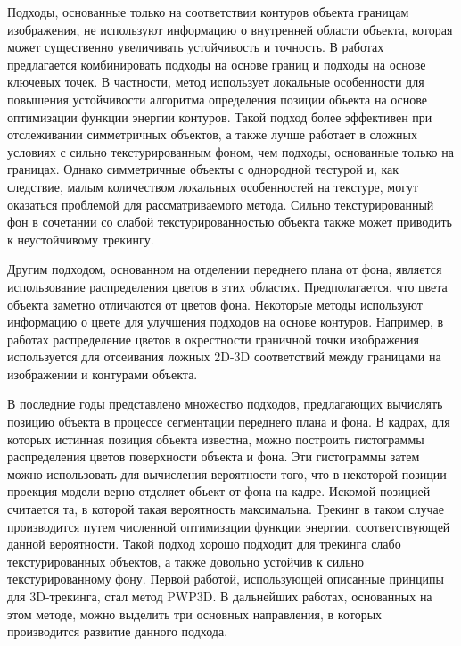 Подходы, основанные только на соответствии контуров объекта границам
изображения, не используют информацию о внутренней области объекта, которая
может существенно увеличивать устойчивость и точность.
В работах \cite{VacchettiEdges2004,ChoiFeaturesAndEdges,Bugaev_2018_ECCV}
предлагается комбинировать подходы на основе границ и подходы на основе
ключевых точек.
В частности, метод \cite{Bugaev_2018_ECCV} использует локальные особенности для
повышения устойчивости алгоритма определения позиции объекта на основе
оптимизации функции энергии контуров.
Такой подход более эффективен при отслеживании симметричных объектов, а также
лучше работает в сложных условиях с сильно текстурированным фоном, чем подходы,
основанные только на границах.
Однако симметричные объекты с однородной тестурой и, как следствие, малым
количеством локальных особенностей на текстуре, могут оказаться проблемой для
рассматриваемого метода.
Сильно текстурированный фон в сочетании со слабой текстурированностью
объекта также может приводить к неустойчивому трекингу.

Другим подходом, основанном на отделении переднего плана от фона, является
использование распределения цветов в этих областях.
Предполагается, что цвета объекта заметно отличаются от цветов фона.
Некоторые методы \cite{SeoHinterstoisser2014,WangZhong2015,Zhong2018}
используют информацию о цвете для улучшения подходов на основе контуров.
Например, в работах \cite{SeoHinterstoisser2014,WangZhong2015} распределение
цветов в окрестности граничной точки изображения используется для отсеивания
ложных 2D-3D соответствий между границами на изображении и контурами объекта.

В последние годы представлено множество подходов, предлагающих вычислять
позицию объекта в процессе сегментации переднего плана и фона.
В кадрах, для которых истинная позиция объекта известна, можно построить
гистограммы распределения цветов поверхности объекта и фона.
Эти гистограммы затем можно использовать для вычисления вероятности того, что в
некоторой позиции проекция модели верно отделяет объект от фона на кадре.
Искомой позицией считается та, в которой такая вероятность максимальна.
Трекинг в таком случае производится путем численной оптимизации функции
энергии, соответствующей данной вероятности.
Такой подход хорошо подходит для трекинга слабо текстурированных объектов, а
также довольно устойчив к сильно текстурированному фону.
Первой работой, использующей описанные принципы для 3D-трекинга, стал метод
PWP3D\cite{PWP3D}.
В дальнейших работах, основанных на этом методе, можно выделить три основных
направления, в которых производится развитие данного подхода.

